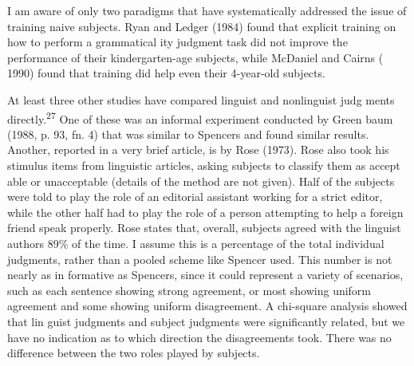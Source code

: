 \setcounter{listWWNumxxxviileveli}{25}
\begin{listWWNumxxxviileveli}
\item 
\begin{styleStandard}
I am aware of only two paradigms that have systematically addressed the issue of training naive subjects. Ryan and Ledger (1984) found that explicit training on how to perform a grammatical\- ity judgment task did not improve the performance of their kindergarten-age subjects, while McDaniel and Cairns ( 1990) found that training did help even their 4-year-old subjects.
\end{styleStandard}


\end{listWWNumxxxviileveli}
\clearpage\setcounter{page}{1}\begin{styleTextbody}
At least three other studies have compared linguist and nonlinguist judg\- ments directly.\textsuperscript{27}\textsuperscript{ }One of these was an informal experiment conducted by Green\- baum (1988, p. 93, fn. 4) that was similar to Spencer{\textquotesingle}s and found similar results. Another, reported in a very brief article, is by Rose (1973). Rose also took his stimulus items from linguistic articles, asking subjects to classify them as accept\- able or unacceptable (details of the method are not given). Half of the subjects were told to play the role of an editorial assistant working for a strict editor, while the other half had to play the role of a person attempting to help a foreign friend speak properly. Rose states that, overall, subjects agreed with the linguist authors 89\% of the time. I assume this is a percentage of the total individual judgments, rather than a pooled scheme like Spencer used. This number is not nearly as in\- formative as Spencer{\textquotesingle}s, since it could represent a variety of scenarios, such as each sentence showing strong agreement, or most showing uniform agreement and some showing uniform disagreement. A chi-square analysis showed that lin\- guist judgments and subject judgments were significantly related, but we have no indication as to which direction the disagreements took. There was no difference between the two roles played by subjects.
\end{styleTextbody}


